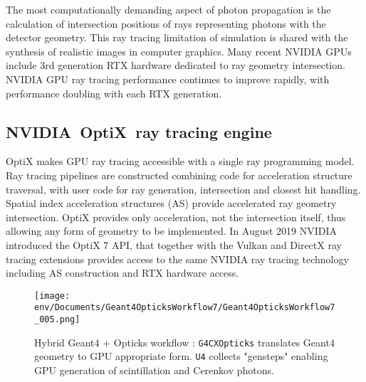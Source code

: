 \documentclass{webofc}
\begin{document}
The most computationally demanding aspect of photon propagation
is the calculation of intersection positions of rays representing photons with the detector geometry.
This ray tracing limitation of simulation is shared with the synthesis of realistic images in computer graphics. 
Many recent NVIDIA GPUs include 3rd generation RTX\cite{rtx} hardware dedicated to ray geometry intersection. 
NVIDIA GPU ray tracing performance continues to improve rapidly, with performance doubling  
with each RTX generation. 
%
%
\subsection{NVIDIA\textregistered\ OptiX\texttrademark\ ray tracing engine}
%
OptiX makes GPU ray tracing accessible with a single ray programming model.
Ray tracing pipelines are constructed combining code for acceleration structure traversal, 
with user code for ray generation, intersection and closest hit handling.
Spatial index acceleration structures (AS) provide accelerated ray geometry intersection. 
OptiX provides only acceleration, not the intersection itself, thus allowing any form of geometry 
to be implemented. 
%
In August 2019 NVIDIA introduced the OptiX 7 API\cite{optix7},
that together with the Vulkan and DirectX ray tracing extensions provides access 
to the same NVIDIA ray tracing technology including AS construction and RTX hardware access. 
%
%
%
%
\begin{figure}[t]
\centering
\texttt{[image: env/Documents/Geant4OpticksWorkflow7/Geant4OpticksWorkflow7\_005.png]}
\caption{Hybrid Geant4 + Opticks workflow : {\tt G4CXOpticks} translates Geant4 geometry to GPU appropriate form. 
{\tt U4} collects "gensteps" enabling GPU generation of scintillation and Cerenkov photons.
}
\label{workflow} 
\vspace{-5mm}
\end{figure}
%
\end{document}
